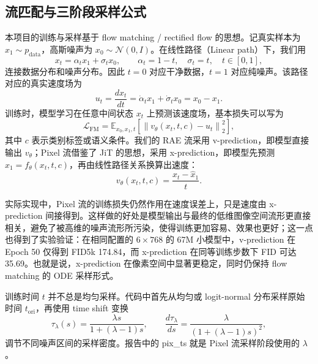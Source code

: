 \documentclass[11pt]{article}
\begin{document}
\subsection{流匹配与三阶段采样公式}
\label{app:flow-matching-details}

本项目的训练与采样基于 flow matching / rectified flow 的思想。记真实样本为 $x_1\sim p_{\mathrm{data}}$，高斯噪声为 $x_0\sim\mathcal N(0,I)$。在线性路径（Linear path）下，我们用
\begin{equation}
    x_t = \alpha_t x_1 + \sigma_t x_0, \qquad
    \alpha_t = 1-t,\quad \sigma_t=t,\quad t\in[0,1],
\end{equation}
连接数据分布和噪声分布。因此 $t=0$ 对应干净数据，$t=1$ 对应纯噪声。该路径对应的真实速度场为
\begin{equation}
    u_t = \frac{d x_t}{dt}
        = \dot{\alpha}_t x_1 + \dot{\sigma}_t x_0
        = x_0 - x_1 .
\end{equation}
训练时，模型学习在任意中间状态 $x_t$ 上预测该速度场，基本损失可以写为
\begin{equation}
    \mathcal L_{\mathrm{FM}}
    = \mathbb E_{x_0,x_1,t}\left[
        \left\| v_\theta(x_t,t,c)-u_t \right\|_2^2
      \right],
\end{equation}
其中 $c$ 表示类别标签或语义条件。我们的 RAE 流采用 v-prediction，即模型直接输出 $v_\theta$；Pixel 流借鉴了 JiT \cite{jit} 的思想，采用 x-prediction，即模型先预测 $\hat{x}_1=f_\theta(x_t,t,c)$，再由线性路径关系换算出速度：
\begin{equation}
    v_\theta(x_t,t,c)
    = \frac{x_t-\hat{x}_1}{t}.
\end{equation}

实际实现中，Pixel 流的训练损失仍然作用在速度误差上，只是速度由 x-prediction 间接得到。这样做的好处是模型输出与最终的低维图像空间流形更直接相关，避免了被高维的噪声流形所污染，使得训练更加容易、效果也更好；这一点也得到了实验验证：在相同配置的 $6\times 768$ 的 67M 小模型中，v-prediction 在 Epoch 50 仅得到 FID5k 174.84，而 x-prediction 在同等训练步数下 FID 可达 35.69。也就是说，x-prediction 在像素空间中显著更稳定，同时仍保持 flow matching 的 ODE 采样形式。

训练时间 $t$ 并不总是均匀采样。代码中首先从均匀或 logit-normal 分布采样原始时间 $t_{\mathrm{ori}}$，再使用 time shift 变换
\begin{equation}
    \tau_\lambda(s)=\frac{\lambda s}{1+(\lambda-1)s},\qquad
    \frac{d\tau_\lambda}{ds}
    =\frac{\lambda}{\left(1+(\lambda-1)s\right)^2},
\end{equation}
调节不同噪声区间的采样密度。报告中的 pix\_ts 就是 Pixel 流采样阶段使用的 $\lambda$。
\end{document}
